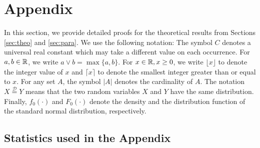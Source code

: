 \documentclass[a4paper,12pt]{article}
\begin{document}
\newpage

{\small
\setlength{\bibsep}{0.55em}
}

\newpage
\appendix
\section{Appendix}\label{appendix}
In this section, we provide detailed proofs for the theoretical results from Sections \ref{sec:theo} and \ref{sec:para}. We use the following notation: The symbol $C$ denotes a universal real constant which may take a different value on each occurrence. For $a,b \in \mathbb{R}$, we write $a \vee b = \max\{a,b\}$. For $x \in \mathbb{R}, x \geq 0$, we write $\lfloor x \rfloor$ to denote the integer value of $x$ and $\lceil x \rceil$ to denote the smallest integer greater than or equal to $x$. For any set $A$, the symbol $|A|$ denotes the cardinality of $A$. The notation $X \stackrel{\mathcal{D}}{=} Y$ means that the two random variables $X$ and $Y$ have the same distribution. Finally, $f_0(\cdot)$ and $F_0(\cdot)$ denote the density and the distribution function of the standard normal distribution, respectively.

\subsection{Statistics used in the Appendix}\label{subsec:appendix:stats}
\end{document}
